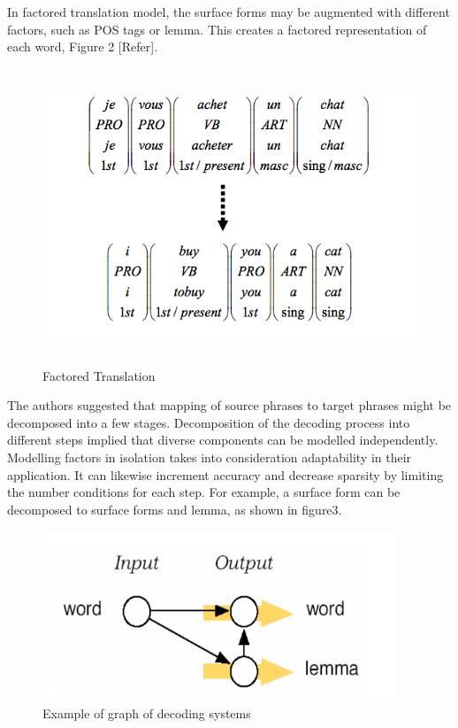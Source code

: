 In factored translation model, the surface forms may be augmented with different factors, such as POS tags or lemma. This creates a factored representation of each word, Figure 2 [Refer].
\begin{figure}
\includegraphics[width=\textwidth,height=250pt]{figures/moses2.png}
\caption{Factored Translation} \label{fig1}
\end{figure}

The authors suggested that mapping of source phrases to target phrases might be decomposed into a few stages. Decomposition of the decoding process into different steps implied that diverse components can be modelled independently. Modelling factors in isolation takes into consideration adaptability in their application. It can likewise increment accuracy and decrease sparsity by limiting the number conditions for each step. For example, a surface form can be decomposed to surface forms and lemma, as shown in figure3.
\begin{figure}
\begin{center}
\includegraphics[width=300pt]{figures/moses3.png}
\caption{Example of graph of decoding systems} \label{fig1}
\end{center}
\end{figure}

